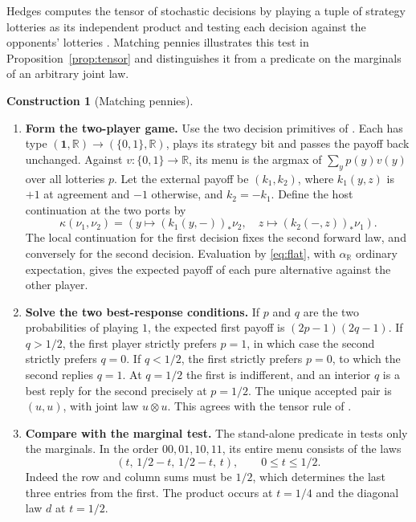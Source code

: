 \documentclass[11pt,a4paper]{article}
\theoremstyle{definition}
\newtheorem*{construction}{Construction}
\newcommand{\one}{\mathbf 1}
\begin{document}
Hedges computes the tensor of stochastic decisions by playing a tuple of strategy lotteries as its independent product and testing each decision against the opponents' lotteries \cite[Sections~3.1.6--3.1.7]{hedges}. Matching pennies illustrates this test in Proposition~\ref{prop:tensor} and distinguishes it from a predicate on the marginals of an arbitrary joint law.

\begin{construction}[Matching pennies]\leavevmode
    \begin{enumerate}[titledsteps]
        \item \textbf{Form the two-player game.} Use the two decision primitives of \cite[Example~6]{gklf}. Each has type $(\one,\mathbb R)\to(\{0,1\},\mathbb R)$, plays its strategy bit and passes the payoff back unchanged. Against $v:\{0,1\}\to\mathbb R$, its menu is the argmax of $\sum_y p(y)v(y)$ over all lotteries $p$. Let the external payoff be $(k_1,k_2)$, where $k_1(y,z)$ is $+1$ at agreement and $-1$ otherwise, and $k_2=-k_1$. Define the host continuation at the two ports by
        \[
            \kappa(\nu_1,\nu_2)=
            \left(y\mapsto(k_1(y,-))_*\nu_2,\quad
            z\mapsto(k_2(-,z))_*\nu_1\right).
        \]
        The local continuation for the first decision fixes the second forward law, and conversely for the second decision. Evaluation by \eqref{eq:flat}, with $\alpha_{\mathbb R}$ ordinary expectation, gives the expected payoff of each pure alternative against the other player.

        \item \textbf{Solve the two best-response conditions.} If $p$ and $q$ are the two probabilities of playing $1$, the expected first payoff is $(2p-1)(2q-1)$. If $q>1/2$, the first player strictly prefers $p=1$, in which case the second strictly prefers $q=0$. If $q<1/2$, the first strictly prefers $p=0$, to which the second replies $q=1$. At $q=1/2$ the first is indifferent, and an interior $q$ is a best reply for the second precisely at $p=1/2$. The unique accepted pair is $(u,u)$, with joint law $u\otimes u$. This agrees with the tensor rule of \cite[Definition~5 and Example~6]{gklf}.

        \item \textbf{Compare with the marginal test.} The stand-alone predicate in \cite[Example~4]{gklf} tests only the marginals. In the order $00,01,10,11$, its entire menu consists of the laws
        \[
            (t,\,1/2-t,\,1/2-t,\,t),\qquad 0\le t\le 1/2 .
        \]
        Indeed the row and column sums must be $1/2$, which determines the last three entries from the first. The product occurs at $t=1/4$ and the diagonal law $d$ at $t=1/2$.


\end{enumerate}
\end{construction}
\end{document}
